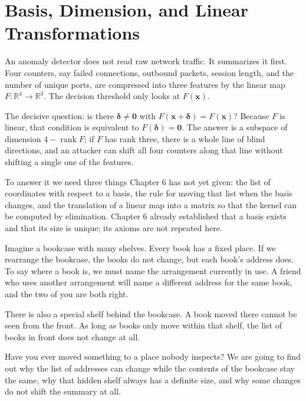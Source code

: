 \chapter{Basis, Dimension, and Linear Transformations}

An anomaly detector does not read raw network traffic. It summarizes it first. Four
counters, say failed connections, outbound packets, session length, and the number of
unique ports, are compressed into three features by the linear map
$F\colon\mathbb{R}^{4}\to\mathbb{R}^{3}$.
The decision threshold only looks at $F(\mathbf{x})$.

The decisive question: is there $\boldsymbol{\delta}\neq\mathbf{0}$ with
$F(\mathbf{x}+\boldsymbol{\delta})=F(\mathbf{x})$? Because $F$ is linear, that condition is
equivalent to
$F(\boldsymbol{\delta})=\mathbf{0}$. The answer is a subspace of dimension
$4-\operatorname{rank}F$; if $F$ has rank three, there is a whole line of blind directions,
and an attacker can shift all four counters along that line without shifting a single one of
the features.

To answer it we need three things Chapter 6 has not yet given: the list of coordinates with
respect to a basis, the rule for moving that list when the basis changes, and the translation
of a linear map into a matrix so that the kernel can be computed by elimination. Chapter 6
already established that a basis exists and that its size is unique; its axioms are not
repeated here.

\begin{untukanak}
Imagine a bookcase with many shelves. Every book has a fixed place. If we rearrange the
bookcase, the books do not change, but each book's address does. To say where a book is, we
must name the arrangement currently in use. A friend who uses another arrangement will name a
different address for the same book,
and the two of you are both right.

There is also a special shelf behind the bookcase. A book moved there cannot be seen from the
front. As long as books only move within that shelf, the list of books in front does not
change at all.

Have you ever moved something to a place nobody inspects? We are going to find out why the
list of addresses can change while the contents of
the bookcase stay the same, why that hidden shelf always has a definite size, and why some
changes do not shift the summary at all.
\end{untukanak}

